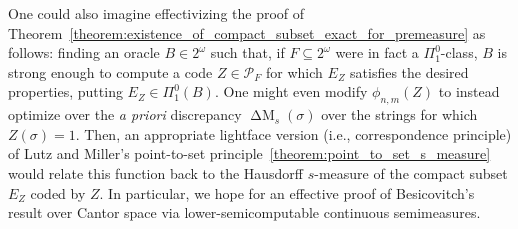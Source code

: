 One could also imagine effectivizing the proof of Theorem~\ref{theorem:existence_of_compact_subset_exact_for_premeasure} as follows: finding an oracle $B \in 2^\omega$ such that, if $F \subseteq 2^\omega$ were in fact a $\Pi^0_1$-class, $B$ is strong enough to compute a code $Z \in \mathcal{P}_F$ for which $E_Z$ satisfies the desired properties, putting $E_Z \in \Pi^0_1(B)$. One might even modify $\phi_{n, m}(Z)$ to instead optimize over the \textit{a priori} discrepancy $\operatorname{\Delta M}_s(\sigma)$ over the strings for which $Z(\sigma) = 1$. Then, an appropriate lightface version (i.e., correspondence principle) of Lutz and Miller's point-to-set principle~\ref{theorem:point_to_set_s_measure} would relate this function back to the Hausdorff $s$-measure of the compact subset $E_Z$ coded by $Z$. In particular, we hope for an effective proof of Besicovitch's result over Cantor space via lower-semicomputable continuous semimeasures. 